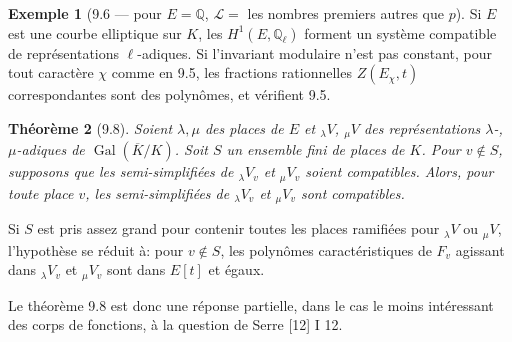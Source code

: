 \documentclass[11pt]{amsart}
\theoremstyle{plain}
\newtheorem{theorem}{Th\'eor\`eme}[section]
\theoremstyle{definition}
\newtheorem{example}[theorem]{Exemple}
\DeclareMathOperator{\Gal}{Gal}
\begin{document}
\begin{example}[9.6 --- pour $E = \mathbb{Q}$, $\mathcal{L} =$ les nombres premiers autres que $p$]
Si $E$ est une courbe elliptique sur $K$, les $H^1(E,\mathbb{Q}_\ell)$ forment un syst\`eme compatible de repr\'esentations $\ell$-adiques. Si l'invariant modulaire n'est pas constant, pour tout caract\`ere $\chi$ comme en 9.5, les fractions rationnelles $Z(E_\chi,t)$ correspondantes sont des polyn\^omes, et v\'erifient 9.5.
\end{example}

\begin{theorem}[9.8]
Soient $\lambda, \mu$ des places de $E$ et $_\lambda V$, $_\mu V$ des repr\'esentations $\lambda$-, $\mu$-adiques de $\Gal(\overline{K}/K)$. Soit $S$ un ensemble fini de places de $K$. Pour $v \notin S$, supposons que les semi-simplifi\'ees de $_\lambda V_v$ et $_\mu V_v$ soient compatibles. Alors, pour toute place $v$, les semi-simplifi\'ees de $_\lambda V_v$ et $_\mu V_v$ sont compatibles.
\end{theorem}

Si $S$ est pris assez grand pour contenir toutes les places ramifi\'ees pour $_\lambda V$ ou $_\mu V$, l'hypoth\`ese se r\'eduit \`a: pour $v \notin S$, les polyn\^omes caract\'eristiques de $F_v$ agissant dans $_\lambda V_v$ et $_\mu V_v$ sont dans $E[t]$ et \'egaux.

Le th\'eor\`eme 9.8 est donc une r\'eponse partielle, dans le cas le moins int\'eressant des corps de fonctions, \`a la question de Serre [12] I 12.
\end{document}
